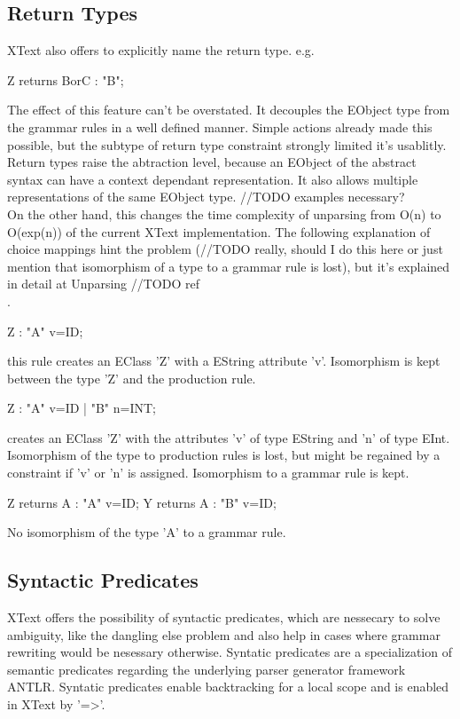 \subsection{Return Types}
XText also offers to explicitly name the return type. e.g.
\begin{xtxt}
Z returns BorC	: "B";
\end{xtxt}
The effect of this feature can't be overstated.  It decouples the EObject type from the grammar rules in a well defined manner. Simple actions already made this possible, but the subtype of return type constraint strongly limited it's usablitly. Return types raise the abtraction level, because an EObject of the abstract syntax can have a context dependant representation. It also allows multiple representations of the same EObject type. //TODO examples necessary? \\ On the other hand, this changes the time complexity of unparsing from O(n) to O(exp(n)) of the current XText implementation. The following explanation of choice mappings hint the problem (//TODO really, should I do this here or just mention that isomorphism of a type to a grammar rule is lost), but it's explained in detail at Unparsing //TODO ref\\.
\begin{xtxt}
Z 	:  "A" v=ID;
\end{xtxt}
this rule creates an EClass 'Z' with a EString attribute 'v'. Isomorphism is kept between the type 'Z' and the production rule.
\begin{xtxt}
Z 	:  "A" v=ID  
	|  "B" n=INT;
	\end{xtxt}
creates an EClass 'Z' with the attributes 'v' of type EString and 'n' of type EInt.  Isomorphism of the type to production rules is lost, but might be regained by a constraint if 'v' or 'n' is assigned. Isomorphism to a grammar rule is kept.
\begin{xtxt}
Z returns A : "A" v=ID;
Y returns A : "B" v=ID;
\end{xtxt}
No isomorphism of the type 'A' to a grammar rule.

\subsection{Syntactic Predicates}
XText offers the possibility of syntactic predicates, which are nessecary to solve ambiguity, like the dangling else problem and also help in cases where grammar rewriting would be nesessary otherwise. Syntatic predicates are a specialization of semantic predicates regarding the underlying parser generator framework ANTLR. Syntatic predicates enable backtracking for a local scope and is enabled in XText by '=>'.